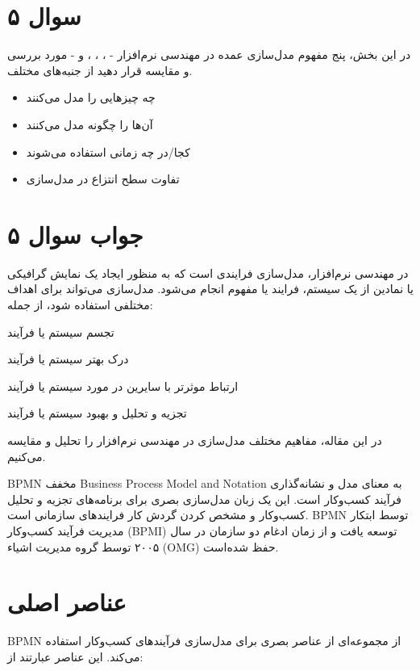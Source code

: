\section*{سوال ۵}

در این بخش، پنج مفهوم مدل‌سازی عمده در مهندسی نرم‌افزار -
،
،
،
و
- مورد بررسی و مقایسه قرار دهید از جنبه‌های مختلف.

\begin{itemize}
	\item چه چیزهایی را مدل می‌کنند
	\item آن‌ها را چگونه مدل می‌کنند
	\item کجا/در چه زمانی استفاده می‌شوند
	\item تفاوت سطح انتزاع در مدل‌سازی
\end{itemize}

\section*{جواب سوال ۵}

در مهندسی نرم‌افزار، مدل‌سازی فرایندی است که به منظور ایجاد یک نمایش گرافیکی یا نمادین از یک سیستم، فرایند یا مفهوم انجام می‌شود. مدل‌سازی می‌تواند برای اهداف مختلفی استفاده شود، از جمله:

تجسم سیستم یا فرآیند

درک بهتر سیستم یا فرآیند

ارتباط موثرتر با سایرین در مورد سیستم یا فرآیند

تجزیه و تحلیل و بهبود سیستم یا فرآیند

در این مقاله، مفاهیم مختلف مدل‌سازی در مهندسی نرم‌افزار را تحلیل و مقایسه می‌کنیم.

BPMN مخفف Business Process Model and Notation به معنای مدل و نشانه‌گذاری فرآیند کسب‌وکار است. این یک زبان مدل‌سازی بصری برای برنامه‌های تجزیه و تحلیل کسب‌وکار و مشخص کردن گردش کار فرایندهای سازمانی است. BPMN توسط ابتکار مدیریت فرآیند کسب‌وکار (BPMI) توسعه یافت و از زمان ادغام دو سازمان در سال ۲۰۰۵ توسط گروه مدیریت اشیاء (OMG) حفظ شده‌است.

\section{عناصر اصلی}

BPMN از مجموعه‌ای از عناصر بصری برای مدل‌سازی فرآیندهای کسب‌وکار استفاده می‌کند. این عناصر عبارتند از:

